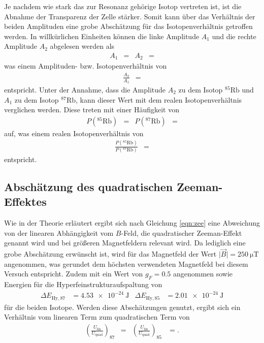 Je nachdem wie stark das zur Resonanz gehörige Isotop vertreten ist, ist die Abnahme der Transparenz der Zelle stärker.
Somit kann über das Verhältnis der beiden Amplituden eine grobe Abschätzung für das Isotopenverhältnis getroffen werden.
In willkürlichen Einheiten können die linke Amplitude $A_1$ und die rechte Amplitude $A_2$ abgelesen werden als
\begin{align*}
  A_1 &=  & A_2 &= 
\end{align*}
was einem Amplituden- bzw. Isotopenverhältnis von
\begin{align*}
  \frac{A_2}{A_1} &= 
\end{align*}
entspricht.
Unter der Annahme, dass die Amplitude $A_2$ zu dem Isotop $^{85}\text{Rb}$ und $A_1$ zu dem Isotop $^{87}\text{Rb}$, kann dieser Wert mit dem realen Isotopenverhältnis \cite{fuck} verglichen werden.
Diese treten mit einer Häufigkeit von
\begin{align*}
  P\left(^{85}\text{Rb}\right) &=  & P\left(^{87}\text{Rb}\right) &= 
\end{align*}
auf, was einem realen Isotopenverhältnis von
\begin{align*}
  \frac{P\left(^{85}\text{Rb}\right)}{P\left(^{87}\text{Rb}\right)} &= 
\end{align*}
entspricht.

\subsection{Abschätzung des quadratischen Zeeman-Effektes}
Wie in der Theorie erläutert ergibt sich nach Gleichung \eqref{eqn:zee} eine Abweichung von der linearen Abhängigkeit vom $B$-Feld, die quadratischer Zeeman-Effekt genannt wird und bei größeren Magnetfeldern relevant wird.
Da lediglich eine grobe Abschätzung erwünscht ist, wird für das Magnetfeld der Wert $\lvert \vec{B} \rvert = \SI{250}{\micro\tesla}$ angenommen, was gerundet dem höchsten verwendeten Magnetfeld bei diesem Versuch entspricht.
Zudem mit ein Wert von $g_F = \num{0.5}$ angenommen sowie Energien für die Hyperfeinstrukturaufspaltung \cite{skript} von
\begin{align*}
  \Delta E_{\text{Hy},87} &= \SI{4.53e-24}{\joule} & \Delta E_{\text{Hy}, 85} &= \SI{2.01e-24}{\joule}
\end{align*}
für die beiden Isotope.
Werden diese Abschätzungen genutzt, ergibt sich ein Verhältnis vom linearen Term zum quadratischen Term von
\begin{align*}
  \left(\frac{U_\text{lin}}{U_\text{quad}}\right)_{87} &=  & \left(\frac{U_\text{lin}}{U_\text{quad}}\right)_{85} &= .
\end{align*}

